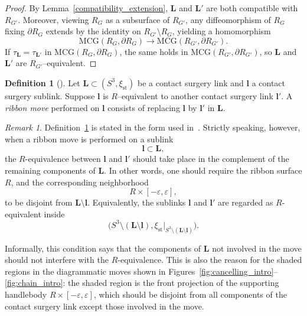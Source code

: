 \documentclass{amsart}
\numberwithin{equation}{section}
\numberwithin{figure}{section}
\theoremstyle{definition}
\newtheorem{definition}[theorem]{Definition}
\theoremstyle{remark}
\newtheorem{remark}[theorem]{Remark}
\let\oldtau\tau
\renewcommand{\tau}{\oldtau}
\let\olddxi\xi %
\renewcommand{\xi}{\olddxi}
\newcommand{\xist}{\olddxi_{\mathrm{st}}}
\begin{document}
\begin{proof}
  By Lemma~\ref{compatibility_extension}, $\boldsymbol{L}$ and $\boldsymbol{L}'$ are both compatible with $R_{G'}$. Moreover, viewing $R_G$ as a subsurface of $R_{G'}$, any diffeomorphism of $R_G$ fixing $\partial R_G$ extends by the identity on $R_{G'}\setminus R_G$, yielding a homomorphism
  \[
    \mathrm{MCG}(R_G,\partial R_G)
    \longrightarrow
    \mathrm{MCG}(R_{G'},\partial R_{G'}).
  \]
  If $\tau_{\scriptscriptstyle{\boldsymbol{L}}}
  =\tau_{\scriptscriptstyle{\boldsymbol{L}'}}$ in $\mathrm{MCG}(R_G,\partial R_G)$, the same holds in $\mathrm{MCG}(R_{G'},\partial R_{G'})$, so $\boldsymbol{L}$ and $\boldsymbol{L}'$ are $R_{G'}$–equivalent.
\end{proof}

\begin{definition}[{\cite[Definition~6.4]{Avdek13}}]\label{def:ribbon_moves}
  Let $\boldsymbol{L}\subset(S^3,\xist)$ be a contact surgery link and $\boldsymbol{l}$ a contact surgery sublink. Suppose $\boldsymbol{l}$ is $R$–equivalent to another contact surgery link $\boldsymbol{l}'$.  
  A \emph{ribbon move} performed on $\boldsymbol{l}$ consists of replacing $\boldsymbol{l}$ by $\boldsymbol{l}'$ in $\boldsymbol{L}$.
\end{definition}

\begin{remark}
Definition~\ref{def:ribbon_moves} is stated in the form used in~\cite{Avdek13}. Strictly speaking, however, when a ribbon move is performed on a sublink
\[
\boldsymbol l\subset \boldsymbol L,
\]
the \(R\)-equivalence between \(\boldsymbol l\) and \(\boldsymbol l'\) should take place in the complement of the remaining components of \(\boldsymbol L\). In other words, one should require the ribbon surface \(R\), and the corresponding neighborhood
\[
R\times[-\varepsilon,\varepsilon],
\]
to be disjoint from \(\boldsymbol L\setminus \boldsymbol l\). Equivalently, the sublinks \(\boldsymbol l\) and \(\boldsymbol l'\) are regarded as \(R\)-equivalent inside
\[
\bigl(S^3\setminus(\boldsymbol L\setminus \boldsymbol l),
\xist|_{S^3\setminus(\boldsymbol L\setminus \boldsymbol l)}\bigr).
\]

Informally, this condition says that the components of \(\boldsymbol L\) not involved in the move should not interfere with the \(R\)-equivalence. This is also the reason for the shaded regions in the diagrammatic moves shown in Figures~\ref{fig:cancelling_intro}--\ref{fig:chain_intro}: the shaded region is the front projection of the supporting handlebody $R\times [-\varepsilon,\varepsilon]$, which should be disjoint from all components of the contact surgery link except those involved in the move.
\end{remark}
\end{document}

